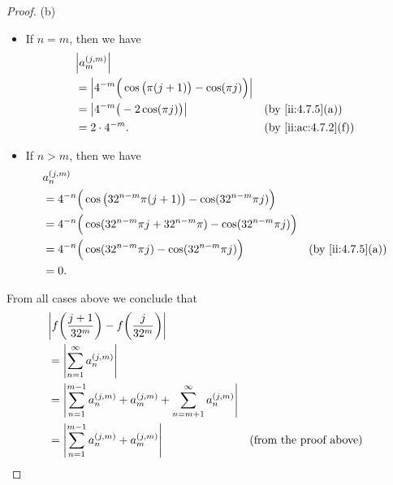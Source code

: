 \begin{proof}{(b)}
\begin{itemize}
    \item If \(n = m\), then we have
          \begin{align*}
             & \abs{a_m^{(j, m)}}                                                                        \\
             & = \abs{4^{-m} \Big(\cos\big(\pi (j + 1)\big) - \cos(\pi j)\Big)}                          \\
             & = \abs{4^{-m} \big(-2 \cos(\pi j)\big)}                          &  & \by{ii:4.7.5}[a]    \\
             & = 2 \cdot 4^{-m}.                                                &  & \by{ii:ac:4.7.2}[f]
          \end{align*}
    \item If \(n > m\), then we have
          \begin{align*}
             & a_n^{(j, m)}                                                                                              \\
             & = 4^{-n} \Big(\cos\big(32^{n - m} \pi (j + 1)\big) - \cos(32^{n - m} \pi j)\Big)                          \\
             & = 4^{-n} \Big(\cos(32^{n - m} \pi j + 32^{n - m} \pi) - \cos(32^{n - m} \pi j)\Big)                       \\
             & = 4^{-n} \Big(\cos(32^{n - m} \pi j) - \cos(32^{n - m} \pi j)\Big)                  &  & \by{ii:4.7.5}[a] \\
             & = 0.
          \end{align*}
  \end{itemize}
  From all cases above we conclude that
  \begin{align*}
     & \abs{f\bigg(\dfrac{j + 1}{32^m}\bigg) - f\bigg(\dfrac{j}{32^m}\bigg)}                                                                                                  \\
     & = \abs{\sum_{n = 1}^\infty a_n^{(j, m)}}                                                                                                                               \\
     & = \abs{\sum_{n = 1}^{m - 1} a_n^{(j, m)} + a_m^{(j, m)} + \sum_{n = m + 1}^\infty a_n^{(j, m)}}                                                                        \\
     & = \abs{\sum_{n = 1}^{m - 1} a_n^{(j, m)} + a_m^{(j, m)}}                                        &                                      & \text{(from the proof above)} \\

\end{align*}
\end{proof}
